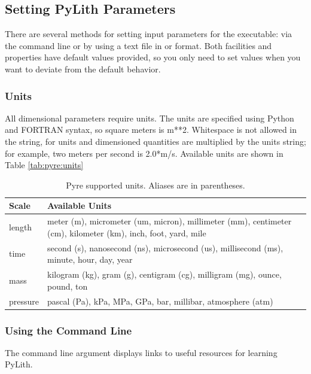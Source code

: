 \subsection{Setting PyLith Parameters}
\label{sec:setting:parameters}

There are several methods for setting input parameters for the
 executable: via the command line or by using a text
file in  or  format. Both facilities and
properties have default values provided, so you only need to set
values when you want to deviate from the default behavior.


\subsubsection{Units}

All dimensional parameters require units. The units are specified
using Python and FORTRAN syntax, so square meters is m**2. Whitespace
is not allowed in the string, for units and dimensioned quantities
are multiplied by the units string; for example, two meters per second
is 2.0*m/s. Available units are shown in Table \vref{tab:pyre:units}

\begin{table}[htbp]
\caption{Pyre supported units. Aliases are in parentheses.}
\label{tab:pyre:units}
\begin{tabular}{lp{5in}}
\textbf{Scale} & \textbf{Available Units} \\
\hline 
length & meter (m), micrometer (um, micron), millimeter (mm), centimeter (cm),
kilometer (km), inch, foot, yard, mile \\
time & second (s), nanosecond (ns), microsecond (us), millisecond (ms), minute,
hour, day, year \\
mass & kilogram (kg), gram (g), centigram (cg), milligram (mg), ounce, pound,
ton \\
pressure & pascal (Pa), kPa, MPa, GPa, bar, millibar, atmosphere (atm) \\
\hline 
\end{tabular}
\end{table}


\subsubsection{Using the Command Line}

The  command line argument displays links to useful
resources for learning PyLith.

